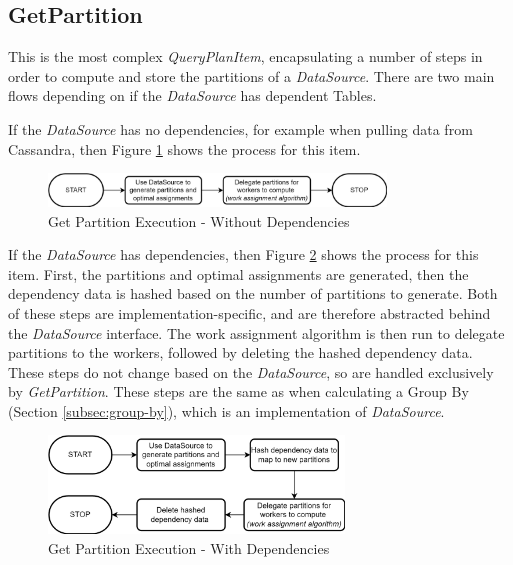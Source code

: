 \subsection{GetPartition}
This is the most complex \textit{QueryPlanItem}, encapsulating a number of steps in order to compute and store the partitions of a \textit{DataSource}. There are two main flows depending on if the \textit{DataSource} has dependent Tables.

If the \textit{DataSource} has no dependencies, for example when pulling data from Cassandra, then Figure \ref{fig:get-partition-no-dependencies} shows the process for this item. 

\begin{figure}[h]
	\centering
	\includegraphics[width=0.8\textwidth]{chapters/diagrams/implementation/get-partition-no-dependencies-flow}
	\caption{Get Partition Execution - Without Dependencies}
	\label{fig:get-partition-no-dependencies}
\end{figure}

If the \textit{DataSource} has dependencies, then Figure \ref{fig:get-partition-dependencies} shows the process for this item. First, the partitions and optimal assignments are generated, then the dependency data is hashed based on the number of partitions to generate. Both of these steps are implementation-specific, and are therefore abstracted behind the \textit{DataSource} interface. The work assignment algorithm is then run to delegate partitions to the workers, followed by deleting the hashed dependency data. These steps do not change based on the \textit{DataSource}, so are handled exclusively by \textit{GetPartition}. These steps are the same as when calculating a Group By (Section \ref{subsec:group-by}), which is an implementation of \textit{DataSource}.

\begin{figure}[h]
	\centering
	\includegraphics[width=0.7\textwidth]{chapters/diagrams/implementation/get-partition-dependencies-flow}
	\caption{Get Partition Execution - With Dependencies}
	\label{fig:get-partition-dependencies}
\end{figure}

